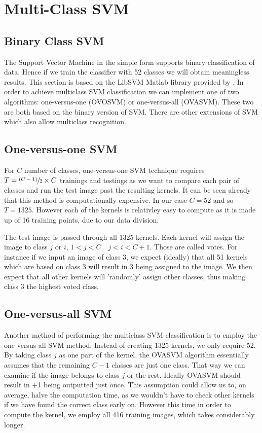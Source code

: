 \documentclass[10pt,twocolumn,letterpaper]{article}
\begin{document}
\section{Multi-Class SVM}
\subsection{Binary Class SVM}
The Support Vector Machine in the simple form supports binary classification of data. Hence if we train the classifier with 52 classes we will obtain meaningless results. This section is based on the LibSVM Matlab library provided by \cite{LibSVM}. In order to achieve multiclass SVM classification we can implement one of two algorithms: one-versus-one (OVOSVM) or one-versus-all (OVASVM). These two are both based on the binary version of SVM. There are other extensions of SVM which also allow multiclass recognition.
\subsection{One-versus-one SVM}
For $C$ number of classes, one-versus-one SVM technique requires $T = \sfrac{(C-1)}{2}\times C$ trainings and testings as we want to compare each pair of classes and run the test image past the resulting kernels. It can be seen already that this method is computationally expensive. In our case $C=52$ and so $T = 1325$. However each of the kernels is relativley easy to compute as it is made up of 16 training points, due to our data division.

The test image is passed through all 1325 kernels. Each kernel will assign the image to class $j$ or $i$, $1<j<C \quad j<i<C+1$. Those are called votes. For instance if we input an image of class 3, we expect (ideally) that all 51 kernels which are based on class 3 will result  in $3$ being assigned to the image. We then expect that all other kernels will 'randomly' assign other classes, thus making class 3 the highest voted class.
 
\subsection{One-versus-all SVM}
Another method of performing the multiclass SVM classification is to employ the one-versus-all SVM method. Instead of creating 1325 kernels, we only require 52. By taking class $j$ as one part of the kernel, the OVASVM algorithm essentially assumes that the remaining $C-1$ classes are just one class. That way we can examine if the image belongs to class $j$ or the rest. Ideally OVASVM should result in +1 being outputted just once. This assumption could allow us to, on average, halve the computation time, as we wouldn't have to check other kernels if we have found the correct class early on. However this time in order to compute the kernel, we employ all 416 training images, which takes considerably longer.
\end{document}
